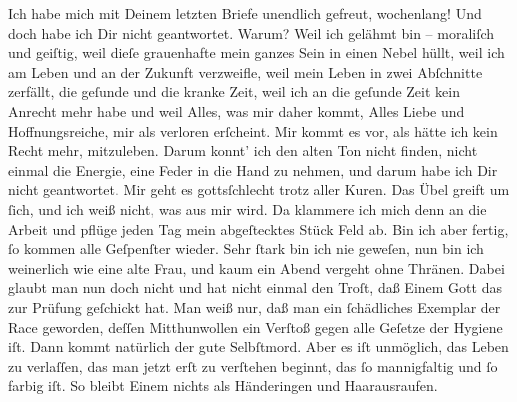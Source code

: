 \pstart
           Ich habe mich mit Deinem letzten Briefe unendlich gefreut, wochenlang! Und doch habe
               ich Dir nicht geantwortet. Warum? Weil ich gelähmt bin – moraliſch und geiſtig, weil
                  dieſe grauenhafte \label{K_L02711-1v}\label{K_L02711-1} mein ganzes Sein in einen Nebel hüllt, weil ich am Leben und an der Zukunft
               verzweifle, weil mein Leben {\pb}in zwei Abſchnitte
               zerfällt, die geſunde und die kranke Zeit, weil ich an die geſunde Zeit kein Anrecht
               mehr habe und weil Alles, was mir daher kommt, Alles Liebe und Hoffnungsreiche, mir
               als verloren erſcheint. Mir kommt es vor, als hätte ich kein Recht mehr, mitzuleben.
               Darum konnt’ ich den alten Ton nicht finden, nicht einmal die Energie, eine Feder in
               die Hand zu nehmen, und darum habe ich Dir nicht geantwortet\textcolor{gray}{.} Mir
               geht es gottsſchlecht trotz aller Kuren. Das Übel greift um{ }ſich, und ich weiß
                  nicht\textcolor{gray}{,} was aus mir wird. Da klammere ich mich denn an die
               Arbeit und pflüge jeden Tag mein abgeſtecktes Stück Feld ab. Bin ich aber fertig,{ }ſo
               kommen alle Geſpenſter {\pb}wieder. Sehr{ }ſtark bin ich
               nie geweſen, nun bin ich weinerlich wie eine alte Frau, und kaum ein Abend vergeht
               ohne Thränen. Dabei glaubt man nun doch nicht und hat nicht einmal den Troſt, daß
               Einem Gott das zur Prüfung geſchickt hat. Man weiß nur, daß man ein{ }ſchädliches
               Exemplar der Race geworden, deſſen Mitthunwollen ein Verſtoß gegen alle Geſetze der
               Hygiene iſt. Dann kommt natürlich der gute Selbſtmord. Aber es iſt unmöglich, das
               Leben zu verlaſſen, das man jetzt erſt zu verſtehen beginnt, das{ }ſo mannigfaltig und{ }ſo farbig iſt. So bleibt Einem nichts als Händeringen und Haarausraufen.\pend
           
